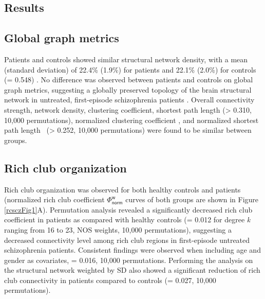 \begin{refsection}
\section*{Results}
\subsection*{Global graph metrics}
Patients and controls showed similar structural network density, with a mean (standard deviation) of 22.4\% (1.9\%) for patients and 22.1\% (2.0\%) for controls (\pval = 0.548) \citep{vanDenHeuvel2017ProportionalTI}. No difference was observed between patients and controls on global graph metrics, suggesting a globally preserved topology of the brain structural network in untreated, first-episode schizophrenia patients \citep{Zhu2016AlterationsOF,Collin2017AffectedAR}. Overall connectivity strength, network density, clustering coefficient, shortest path length (\pval > 0.310, 10,000 permutations), normalized clustering coefficient \textgamma, and normalized shortest path length \textlambda \ (\pval > 0.252, 10,000 permutations) were found to be similar between groups.

\subsection*{Rich club organization}
Rich club organization was observed for both healthy controls and patients (normalized rich club coefficient $\mathsf{{\Phi}^{w}_{norm}}$ curves of both groups are shown in Figure \ref{rcsczFig1}A). Permutation analysis revealed a significantly decreased rich club coefficient in patients as compared with healthy controls (\pval = 0.012 for degree \textit{k} ranging from 16 to 23, NOS weights, 10,000 permutations), suggesting a decreased connectivity level among rich club regions in first-episode untreated schizophrenia patients. Consistent findings were observed when including age and gender as covariates, \pval = 0.016, 10,000 permutations. Performing the analysis on the structural network weighted by SD also showed a significant reduction of rich club connectivity in patients compared to controls (\pval = 0.027, 10,000 permutations).


\end{refsection}
